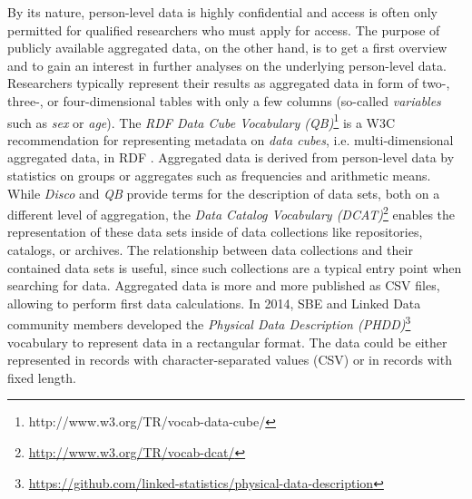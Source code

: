 \documentclass{llncs}
\newcommand{\tb}[1]{\todo[size=\small, color=green!40]{\textbf{Thomas:} #1}}
\begin{document}
By its nature, person-level data is highly confidential and access is often only permitted for qualified researchers who must apply for access. 
The purpose of publicly available aggregated data, on the other hand, is to get a first overview and to gain an interest in further analyses on the underlying person-level data.
Researchers typically represent their results as aggregated data in form of two-, three-, or four-dimensional tables with only a few columns (so-called \emph{variables} such as \emph{sex} or \emph{age}).
The \emph{RDF Data Cube Vocabulary (QB)}\footnote{http://www.w3.org/TR/vocab-data-cube/} is a W3C recommendation for representing metadata on \emph{data cubes}, i.e. multi-dimensional aggregated data, in RDF \cite{Cyganiak2010}. 
Aggregated data is derived from person-level data by statistics on groups or aggregates such as frequencies and arithmetic means.
While \emph{Disco} and \emph{QB} provide terms for the description of data sets, 
both on a different level of aggregation, 
the \emph{Data Catalog Vocabulary (DCAT)}\footnote{\url{http://www.w3.org/TR/vocab-dcat/}} enables the representation of these data sets inside of data collections like repositories, catalogs, or archives. 
The relationship between data collections and their contained data sets is useful, since such collections are a typical entry point when searching for data.
Aggregated data is more and more published as CSV files,
allowing to perform first data calculations.
In 2014, SBE and Linked Data community members developed the \emph{Physical Data Description (PHDD)}\footnote{\url{https://github.com/linked-statistics/physical-data-description}} vocabulary to represent data in a rectangular format.\tb{tabular data} 
The data could be either represented in records with character-separated values (CSV) or in records with fixed length. 
\end{document}
